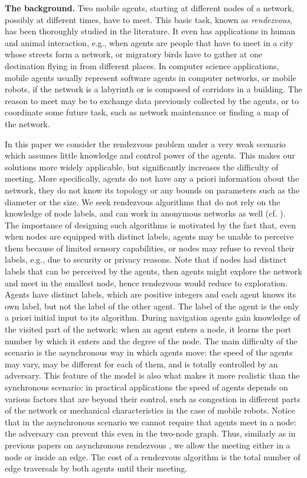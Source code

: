 \documentclass [11pt] {article}
\begin{document}
\noindent
{\bf The background.}
Two mobile agents, starting at different nodes of a network, possibly at different times, have to meet.
This basic task,  known  as {\em rendezvous}, has been thoroughly studied in the literature.
It even has applications in human and animal interaction, e.g., when agents are people that have to meet in a city whose streets form a network,
or migratory birds have to gather at one destination flying in from different places.
In computer science applications,
mobile agents usually represent software agents in computer networks, or mobile robots, if the network is a labyrinth or is composed of corridors in a building.
The reason to meet may be to exchange data previously collected by the agents,
or to coordinate some future task, such as network maintenance or finding a map of the network.

In this paper we consider the rendezvous problem under a very weak scenario which assumes little knowledge and control power of the agents.
This makes our solutions more widely applicable, but significantly increases the difficulty of meeting. More specifically, agents do not have any a priori information about the network, they do not know its topology or any bounds on parameters such as the diameter or the size. 
We seek rendezvous algorithms that do not
rely on the knowledge of node labels, and can work in anonymous networks as well  (cf. \cite{alpern02b}). 
The importance of designing such algorithms
is motivated by the fact that, even when nodes are equipped with distinct labels, agents may be unable to perceive them
because of limited sensory capabilities, 
or nodes may refuse to reveal their labels, e.g., due to security or privacy reasons.
Note that if nodes had distinct labels that can be perceived by the agents, then agents might explore the network and meet in the smallest node, hence rendezvous would reduce to exploration.
Agents have distinct labels, which are positive integers and each agent knows its own label, but not the label of the other agent. 
The label of the agent is the only a priori initial input to its algorithm. During navigation agents gain knowledge of the visited part of the network:
when an agent enters a node, it learns the port number by which it enters and the degree of the node.
The main difficulty of the scenario is the asynchronous way in which agents move: the speed of the agents may vary, may be different for each of them, and is totally controlled by an adversary.  This feature of the model is also what makes it more realistic than the synchronous scenario: in practical applications the speed of agents depends on various factors
that are beyond their control, such as congestion in different parts of the network or mechanical characteristics in the case of mobile robots.
Notice that in the asynchronous scenario we cannot require that agents meet in a node: the adversary can prevent this even in the two-node graph.
Thus, similarly as in previous papers on asynchronous rendezvous \cite{BCGIL,CCGL,CLP,DGKKPV,GP}, we allow the meeting either in
a node or inside an edge. 
The cost of a rendezvous algorithm is the total number of edge traversals by both agents until their
meeting.
\end{document}
